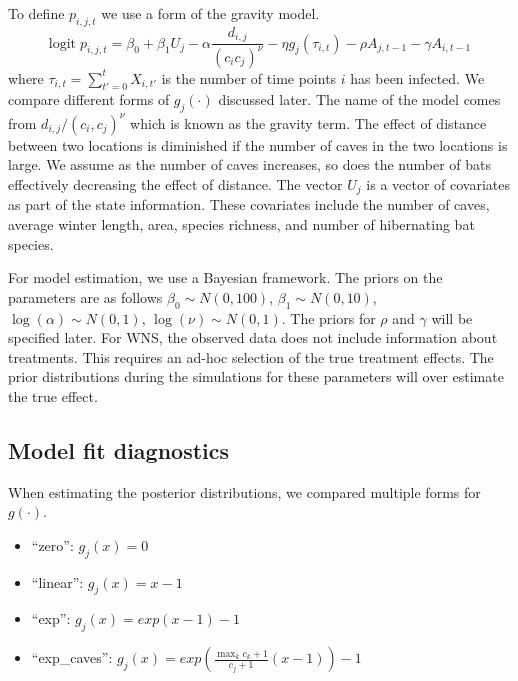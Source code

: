 \documentclass[11pt]{article}
\newcommand{\logit}{\text{logit}}
\begin{document}
To define $p_{i,j,t}$ we use a form of the gravity model.
\begin{equation*}
\logit \; p_{i,j,t} = \beta_0 + \beta_1 U_j 
- \alpha \frac{d_{i,j}}{(c_ic_j)^\nu} - \eta g_j(\tau_{i,t})
- \rho A_{j,t-1} - \gamma A_{i,t-1}
\end{equation*}
where $\tau_{i,t} = \sum_{t' = 0}^t X_{i,t'}$ is the number of time
points $i$ has been infected.  We compare different forms of
$g_j(\cdot)$ discussed later.  The name of the model comes from
$d_{i,j}/(c_i,c_j)^\nu$ which is known as the gravity term.  The
effect of distance between two locations is diminished if the number
of caves in the two locations is large.  We assume as the number of
caves increases, so does the number of bats effectively decreasing the
effect of distance.  The vector $U_j$ is a vector of covariates as
part of the state information.  These covariates include the number of
caves, average winter length, area, species richness, and number of
hibernating bat species.

For model estimation, we use a Bayesian framework.  The priors on the
parameters are as follows $\beta_0 \sim N(0,100)$, $\beta_1 \sim
   N(0,10)$, $\log(\alpha) \sim N(0,1)$, $\log(\nu) \sim N(0,1)$.  The
priors for $\rho$ and $\gamma$ will be specified later.  For WNS, the
observed data does not include information about treatments.  This
requires an ad-hoc selection of the true treatment effects.  The prior
distributions during the simulations for these parameters will over
estimate the true effect.

\subsection{Model fit diagnostics}
\label{sec-2-2}

When estimating the posterior distributions, we compared multiple
forms for $g(\cdot)$.
\begin{itemize}
\item ``zero'': $g_j(x) = 0$
\item ``linear'': $g_j(x) = x - 1$
\item ``exp'': $g_j(x) = exp(x - 1) - 1$
\item ``exp\_caves'': $g_j(x) = exp(\frac{\max_k c_k+1}{c_j + 1}(x - 1)) - 1$
\end{itemize}
\end{document}
